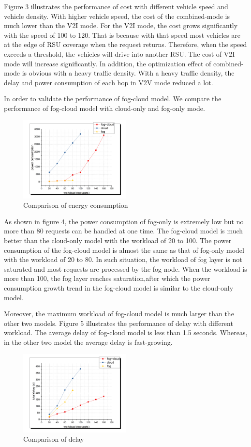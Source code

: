 \documentclass[journal]{IEEEtran}
\begin{document}
Figure 3 illustrates the performance of cost with different vehicle speed and vehicle density. With higher vehicle speed, the cost of the combined-mode is much lower than the V2I mode. For the V2I mode, the cost grows significantly with the speed of 100 to 120. That is because with that speed most vehicles are at the edge of RSU coverage when the request returns. Therefore, when the speed exceeds a threshold, the vehicles will drive into another RSU. The cost of V2I mode will increase significantly. In addition, the optimization effect of combined-mode is obvious with a heavy traffic density. With a heavy traffic density, the delay and power consumption of each hop in V2V mode reduced a lot. 

In order to validate the performance of fog-cloud model. We compare the performance of fog-cloud model with cloud-only and fog-only mode. 
\begin{figure}[htp]
\includegraphics[width = 0.5\textwidth]{e.png}
\caption{Comparison of energy consumption}
\end{figure}

As shown in figure 4, the power consumption of fog-only is extremely low but no more than 80 requests can be handled at one time. The fog-cloud model is much better than the cloud-only model with the workload of 20 to 100. The power consumption of the fog-cloud model is almost the same as that of fog-only model with the workload of 20 to 80. In such situation, the workload of fog layer is not saturated and most requests are processed by the fog node. When the workload is more than 100, the fog layer reaches saturation,after which the power consumption growth trend in the fog-cloud model is similar to the cloud-only model.

Moreover, the maximum workload of fog-cloud model is much larger than the other two models. Figure 5 illustrates the performance of delay with different workload. The average delay of fog-cloud model is less than 1.5 seconds. Whereas, in the other two model the average delay is fast-growing. 
\begin{figure}[htbp]
\includegraphics[width = 0.5\textwidth]{f.png}
\caption{Comparison of delay}
\end{figure}
\end{document}
